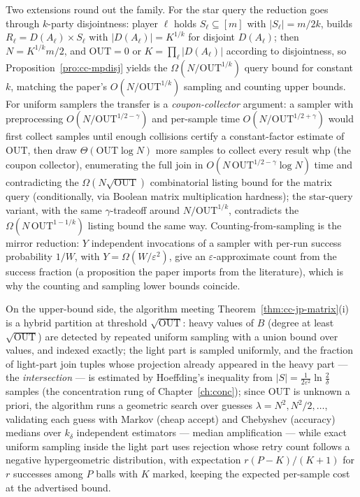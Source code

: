 Two extensions round out the family. For the star query the reduction goes through
$k$-party disjointness: player $\ell$ holds $S_\ell \subseteq [m]$ with
$|S_\ell| = m/2k$, builds $R_\ell = D(A_\ell) \times S_\ell$ with
$|D(A_\ell)| = K^{1/k}$ for disjoint $D(A_\ell)$; then $N = K^{1/k} m/2$, and
$\mathrm{OUT} = 0$ or $K = \prod_\ell |D(A_\ell)|$ according to disjointness, so
Proposition~\ref{pro:cc-mpdisj} yields the $\Omega(N/\mathrm{OUT}^{1/k})$ query
bound for constant $k$, matching the paper's $O(N/\mathrm{OUT}^{1/k})$ sampling and
counting upper bounds. For uniform samplers the transfer is a
\emph{coupon-collector} argument: a sampler with preprocessing
$O(N/\mathrm{OUT}^{1/2-\gamma})$ and per-sample time
$O(N/\mathrm{OUT}^{1/2+\gamma})$ would first collect samples until enough
collisions certify a constant-factor estimate of $\mathrm{OUT}$, then draw
$\Theta(\mathrm{OUT}\log N)$ more samples to collect every result whp (the coupon
collector), enumerating the full join in $O(N\,\mathrm{OUT}^{1/2-\gamma}\log N)$
time and contradicting the $\Omega(N\sqrt{\mathrm{OUT}})$ combinatorial listing
bound for the matrix query (conditionally, via Boolean matrix multiplication
hardness); the star-query variant, with the same $\gamma$-tradeoff around
$N/\mathrm{OUT}^{1/k}$, contradicts the $\Omega(N\,\mathrm{OUT}^{1-1/k})$ listing
bound the same way. Counting-from-sampling is the mirror reduction: $Y$ independent
invocations of a sampler with per-run success probability $1/W$, with
$Y = \Omega(W/\varepsilon^2)$, give an $\varepsilon$-approximate count from the
success fraction (a proposition the paper imports from the literature), which is why
the counting and sampling lower bounds coincide.

On the upper-bound side, the algorithm meeting Theorem~\ref{thm:cc-jp-matrix}(i) is
a hybrid partition at threshold $\sqrt{\mathrm{OUT}}$: heavy values of $B$ (degree
at least $\sqrt{\mathrm{OUT}}$) are detected by repeated uniform sampling with a
union bound over values, and indexed exactly; the light part is sampled uniformly,
and the fraction of light-part join tuples whose projection already appeared in the
heavy part --- the \emph{intersection} --- is estimated by Hoeffding's inequality
from $|S| = \tfrac{1}{2\varepsilon^2}\ln\tfrac{2}{\delta}$ samples (the
concentration rung of Chapter~\ref{ch:conc}); since $\mathrm{OUT}$ is unknown a
priori, the algorithm runs a geometric search over guesses $\lambda = N^2, N^2/2,
\dots$, validating each guess with Markov (cheap accept) and Chebyshev (accuracy)
medians over $k_\delta$ independent estimators --- median amplification --- while
exact uniform sampling inside the light part uses rejection whose retry count
follows a negative hypergeometric distribution, with expectation $r(P-K)/(K+1)$ for
$r$ successes among $P$ balls with $K$ marked, keeping the expected per-sample cost
at the advertised bound.

